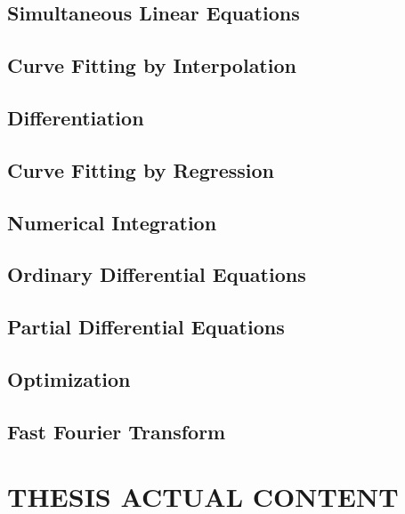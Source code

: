 \documentclass[12pt]{report}
\begin{document}
        \section{Simultaneous Linear Equations}

        \section{Curve Fitting by Interpolation}

        \section{Differentiation}

        \section{Curve Fitting by Regression}

        \section{Numerical Integration}

        \section{Ordinary Differential Equations}

        \section{Partial Differential Equations}

        \section{Optimization}

        \section{Fast Fourier Transform}
 

\chapter{THESIS ACTUAL CONTENT}
\end{document}
